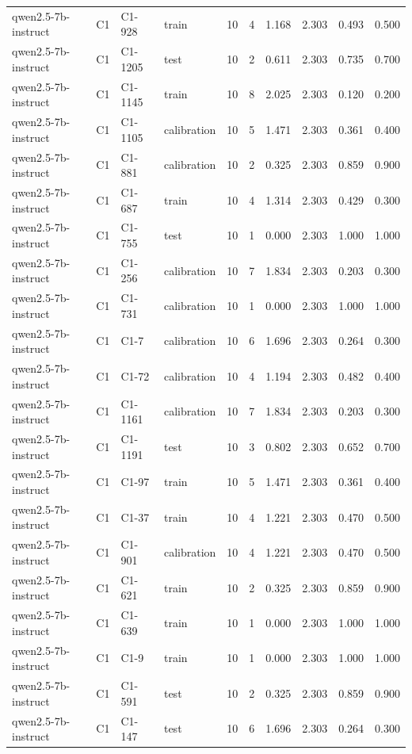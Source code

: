 \begin{table}
\begin{tabular}{llllrrrrrr}
qwen2.5-7b-instruct & C1 & C1-928 & train & 10 & 4 & 1.168 & 2.303 & 0.493 & 0.500 \\
qwen2.5-7b-instruct & C1 & C1-1205 & test & 10 & 2 & 0.611 & 2.303 & 0.735 & 0.700 \\
qwen2.5-7b-instruct & C1 & C1-1145 & train & 10 & 8 & 2.025 & 2.303 & 0.120 & 0.200 \\
qwen2.5-7b-instruct & C1 & C1-1105 & calibration & 10 & 5 & 1.471 & 2.303 & 0.361 & 0.400 \\
qwen2.5-7b-instruct & C1 & C1-881 & calibration & 10 & 2 & 0.325 & 2.303 & 0.859 & 0.900 \\
qwen2.5-7b-instruct & C1 & C1-687 & train & 10 & 4 & 1.314 & 2.303 & 0.429 & 0.300 \\
qwen2.5-7b-instruct & C1 & C1-755 & test & 10 & 1 & 0.000 & 2.303 & 1.000 & 1.000 \\
qwen2.5-7b-instruct & C1 & C1-256 & calibration & 10 & 7 & 1.834 & 2.303 & 0.203 & 0.300 \\
qwen2.5-7b-instruct & C1 & C1-731 & calibration & 10 & 1 & 0.000 & 2.303 & 1.000 & 1.000 \\
qwen2.5-7b-instruct & C1 & C1-7 & calibration & 10 & 6 & 1.696 & 2.303 & 0.264 & 0.300 \\
qwen2.5-7b-instruct & C1 & C1-72 & calibration & 10 & 4 & 1.194 & 2.303 & 0.482 & 0.400 \\
qwen2.5-7b-instruct & C1 & C1-1161 & calibration & 10 & 7 & 1.834 & 2.303 & 0.203 & 0.300 \\
qwen2.5-7b-instruct & C1 & C1-1191 & test & 10 & 3 & 0.802 & 2.303 & 0.652 & 0.700 \\
qwen2.5-7b-instruct & C1 & C1-97 & train & 10 & 5 & 1.471 & 2.303 & 0.361 & 0.400 \\
qwen2.5-7b-instruct & C1 & C1-37 & train & 10 & 4 & 1.221 & 2.303 & 0.470 & 0.500 \\
qwen2.5-7b-instruct & C1 & C1-901 & calibration & 10 & 4 & 1.221 & 2.303 & 0.470 & 0.500 \\
qwen2.5-7b-instruct & C1 & C1-621 & train & 10 & 2 & 0.325 & 2.303 & 0.859 & 0.900 \\
qwen2.5-7b-instruct & C1 & C1-639 & train & 10 & 1 & 0.000 & 2.303 & 1.000 & 1.000 \\
qwen2.5-7b-instruct & C1 & C1-9 & train & 10 & 1 & 0.000 & 2.303 & 1.000 & 1.000 \\
qwen2.5-7b-instruct & C1 & C1-591 & test & 10 & 2 & 0.325 & 2.303 & 0.859 & 0.900 \\
qwen2.5-7b-instruct & C1 & C1-147 & test & 10 & 6 & 1.696 & 2.303 & 0.264 & 0.300 \\

\end{tabular}
\end{table}
